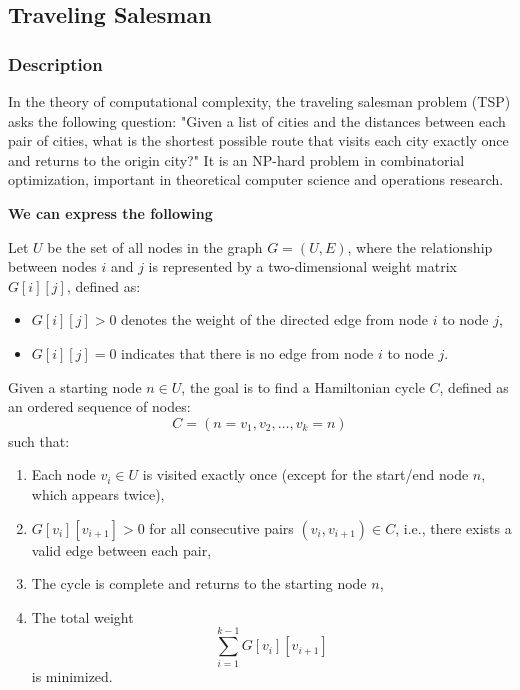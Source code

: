 \subsection{Traveling Salesman}
\subsubsection{Description}

In the theory of computational complexity, the traveling salesman problem (TSP) asks the following question: "Given a list of cities and the distances between each pair of cities, what is the shortest possible route that visits each city exactly once and returns to the origin city?" It is an NP-hard problem in combinatorial optimization, important in theoretical computer science and operations research.

\textbf{We can express the following}

Let \( U \) be the set of all nodes in the graph \( G = (U, E) \), where the relationship between nodes \( i \) and \( j \) is represented by a two-dimensional weight matrix \( G[i][j] \), defined as:

\begin{itemize}
    \item \( G[i][j] > 0 \) denotes the weight of the directed edge from node \( i \) to node \( j \),
    \item \( G[i][j] = 0 \) indicates that there is no edge from node \( i \) to node \( j \).
\end{itemize}

Given a starting node \( n \in U \), the goal is to find a Hamiltonian cycle \( C \), defined as an ordered sequence of nodes:
\[
C = (n = v_1, v_2, \ldots, v_k = n)
\]
such that:

\begin{enumerate}[label=(\alph*)]
    \item Each node \( v_i \in U \) is visited exactly once (except for the start/end node \( n \), which appears twice),
    \item \( G[v_i][v_{i+1}] > 0 \) for all consecutive pairs \( (v_i, v_{i+1}) \in C \), i.e., there exists a valid edge between each pair,
    \item The cycle is complete and returns to the starting node \( n \),
    \item The total weight
    \[
    \sum_{i=1}^{k-1} G[v_i][v_{i+1}]
    \]
    is minimized.
\end{enumerate}

